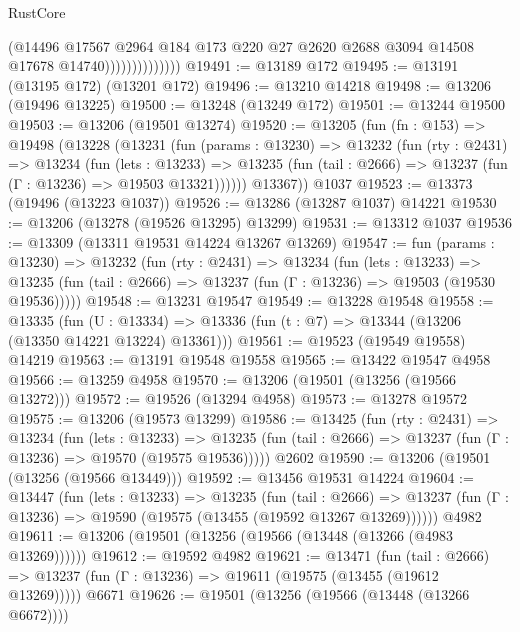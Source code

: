 \begin{lexlean}{RustCore}
\begin{coremodule}
                              (@14496
                                @17567
                                @2964
                                @184
                                @173
                                @220
                                @27
                                @2620
                                @2688
                                @3094
                                @14508
                                @17678
                                @14740))))))))))))))
@19491 := @13189 @172
@19495 := @13191 (@13195 @172) (@13201 @172)
@19496 := @13210 @14218
@19498 := @13206 (@19496 @13225)
@19500 := @13248 (@13249 @172)
@19501 := @13244 @19500
@19503 := @13206 (@19501 @13274)
@19520 := @13205
    (fun (fn : @153) =>
    @19498
      (@13228
        (@13231
          (fun (params : @13230) =>
          @13232
            (fun (rty : @2431) =>
            @13234
              (fun (lets : @13233) =>
              @13235 (fun (tail : @2666) => @13237 (fun (Γ : @13236) => @19503 @13321))))))
        @13367))
    @1037
@19523 := @13373 (@19496 (@13223 @1037))
@19526 := @13286 (@13287 @1037) @14221
@19530 := @13206 (@13278 (@19526 @13295) @13299)
@19531 := @13312 @1037
@19536 := @13309 (@13311 @19531 @14224 @13267 @13269)
@19547 := fun (params : @13230) =>
  @13232
    (fun (rty : @2431) =>
    @13234
      (fun (lets : @13233) =>
      @13235 (fun (tail : @2666) => @13237 (fun (Γ : @13236) => @19503 (@19530 @19536)))))
@19548 := @13231 @19547
@19549 := @13228 @19548
@19558 := @13335
    (fun (U : @13334) => @13336 (fun (t : @7) => @13344 (@13206 (@13350 @14221 @13224) @13361)))
@19561 := @19523 (@19549 @19558) @14219
@19563 := @13191 @19548 @19558
@19565 := @13422 @19547 @4958
@19566 := @13259 @4958
@19570 := @13206 (@19501 (@13256 (@19566 @13272)))
@19572 := @19526 (@13294 @4958)
@19573 := @13278 @19572
@19575 := @13206 (@19573 @13299)
@19586 := @13425
    (fun (rty : @2431) =>
    @13234
      (fun (lets : @13233) =>
      @13235 (fun (tail : @2666) => @13237 (fun (Γ : @13236) => @19570 (@19575 @19536)))))
    @2602
@19590 := @13206 (@19501 (@13256 (@19566 @13449)))
@19592 := @13456 @19531 @14224
@19604 := @13447
    (fun (lets : @13233) =>
    @13235
      (fun (tail : @2666) =>
      @13237 (fun (Γ : @13236) => @19590 (@19575 (@13455 (@19592 @13267 @13269))))))
    @4982
@19611 := @13206 (@19501 (@13256 (@19566 (@13448 (@13266 (@4983 @13269))))))
@19612 := @19592 @4982
@19621 := @13471
    (fun (tail : @2666) => @13237 (fun (Γ : @13236) => @19611 (@19575 (@13455 (@19612 @13269)))))
    @6671
@19626 := @19501 (@13256 (@19566 (@13448 (@13266 @6672))))

\end{coremodule}
\end{lexlean}
